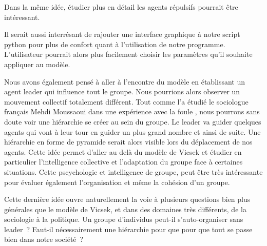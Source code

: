 \documentclass[french, a4paper, 12pt]{article}
\begin{document}
	Dans la même idée, étudier plus en détail les agents répulsifs pourrait être intéressant.
	
	Il serait aussi interrésant de rajouter une interface graphique à notre script python pour plus de confort quant à l'utilisation de notre programme. L'utilisateur pourrait alors plus facilement choisir les paramètres qu'il souhaite appliquer au modèle.
	
	Nous avons également pensé à aller à l'encontre du modèle en établissant un agent leader qui influence tout le groupe. Nous pourrions alors observer un mouvement collectif totalement différent. Tout comme l'a étudié le sociologue français Mehdi Moussaoui dans une expérience avec la foule \cite{fouloscopie}, nous pourrons sans doute voir une hiérarchie se créer au sein du groupe. Le leader va guider quelques agents qui vont à leur tour en guider un plus grand nombre et ainsi de suite. Une hiérarchie en forme de pyramide serait alors visible lors du déplacement de nos agents. Cette idée permet d'aller au delà du modèle de Vicsek et étudier en particulier l'intelligence collective et l'adaptation du groupe face à certaines situations. Cette pscychologie et intelligence de groupe, peut être très intéressante pour évaluer également l'organisation et même la cohésion d'un groupe.
	
	Cette dernière idée ouvre naturellement la voie à plusieurs questions bien plus générales que le modèle de Vicsek, et dans des domaines très différents, de la sociologie à la politique. Un groupe d'individus peut-il s'auto-organiser sans leader~? Faut-il nécessairement une hiérarchie pour que pour que tout se passe bien dans notre société~?   
       



\end{document}
